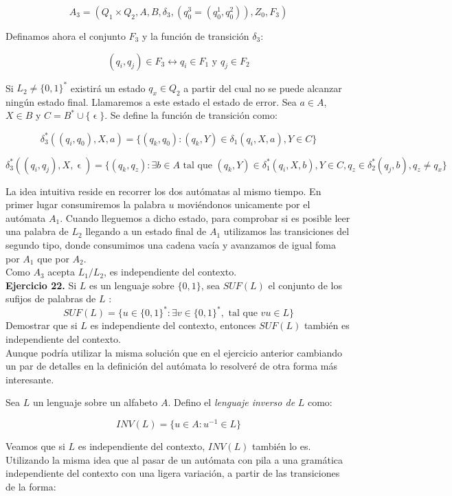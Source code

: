 \documentclass[11pt,a4paper]{article}
\let\epsilon\upvarepsilon
\begin{document}
$$ A_3 = (Q_1 \times Q_2, A, B, \delta_3, (q_0^3 = (q_0^1, q_0^2)), Z_0, F_3) $$

Definamos ahora el conjunto $F_3$ y la función de transición $\delta_3$:

$$ (q_i, q_j) \in F_3 \leftrightarrow q_i \in F_1 \text{ y } q_j \in F_2 $$

Si $L_2 \neq \{0,1\}^*$ existirá un estado $q_x \in Q_2$ a partir del cual no se puede alcanzar ningún estado final. Llamaremos a este estado el estado de error. Sea $a\in A$, $X \in B$ y $C = B^*\cup \{\epsilon\}$. Se define la función de transición como:

$$ \delta_3^* ((q_i, q_0), X, a) = \{(q_k, q_0) : (q_k, Y) \in \delta_1(q_i, X, a), Y \in C \} $$

$$ \delta_3^* ((q_i, q_j), X, \epsilon) = \{(q_k, q_z) : \exists b \in A \text { tal que }  (q_k, Y) \in \delta_1^*(q_i, X, b), Y \in C, q_z \in \delta_2^* (q_j, b), q_z \neq q_x \} $$

La idea intuitiva reside en recorrer los dos autómatas al mismo tiempo. En primer lugar consumiremos la palabra $u$ moviéndonos unicamente por el autómata $A_1$. Cuando lleguemos a dicho estado, para comprobar si es posible leer una palabra de $L_2$ llegando a un estado final de $A_1$ utilizamos las transiciones del segundo tipo, donde consumimos una cadena vacía y avanzamos de igual foma por $A_1$ que por $A_2$. \\

Como $A_3$ acepta $L_1/L_2$, es independiente del contexto. \\

\textbf{Ejercicio 22.} Si $L$ es un lenguaje sobre $\{0, 1\}$, sea $SUF(L)$ el conjunto de los sufijos de palabras de $L$ :
$$SUF(L) = \{u \in \{0, 1\}^* : \exists v \in \{0, 1\}^* , \text{ tal que } vu \in L \} $$ Demostrar que si $L$ es independiente del contexto, entonces $SUF(L)$ también es independiente del contexto. \\

Aunque podría utilizar la misma solución que en el ejercicio anterior cambiando un par de detalles en la definición del autómata lo resolveré de otra forma más interesante.

Sea $L$ un lenguaje sobre un alfabeto $A$. Defino el \emph{lenguaje inverso de} $L$ como:

$$ INV(L) = \{u \in A : u^{-1} \in L \}$$

Veamos que si $L$ es independiente del contexto, $INV(L)$ también lo es. Utilizando la misma idea que al pasar de un autómata con pila a una gramática independiente del contexto con una ligera variación, a partir de las transiciones de la forma:
\end{document}
